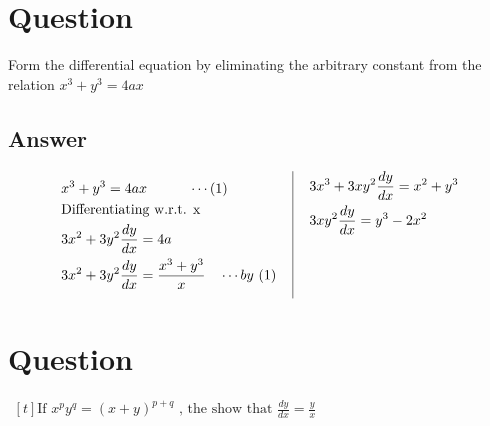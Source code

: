 \documentclass[17pt]{extarticle}
\begin{document}
\noindent
\begin{fleqn} 


\section{Question} 
Form the differential equation by eliminating the arbitrary constant from the relation $ x^3 + y^3 = 4ax$

\subsection*{Answer}
\begin{equation} \nonumber
\begin{alignedat}{4}
&  x^3 + y^3 = 4ax  \quad\quad\quad \cdots (1)  \\
& \text{Differentiating w.r.t. x \ }\\
& 3x^2 + 3y^2 \frac{dy}{dx}= 4a \\
& 3x^2 + 3y^2\frac{dy}{dx}= \frac{x^3+y^3}{x} \quad \cdots by \ (1) \quad \\
\end{alignedat}
\,
\vrule
\quad
\, 
\begin{alignedat}{4}
& 3x^3 + 3xy^2\frac{dy}{dx}=  x^2+y^3\\
& 3xy^2\frac{dy}{dx}=  y^3-2x^2\\& \\
& \\
& \\
\end{alignedat}
\end{equation}
\section{Question} 

$\begin{aligned}[t] 
\text{If \ } x^p y^q = (x+y)^{p+q} \text{\ , \ the show that \ \  } \frac{dy}{dx}=\frac{y}{x}
\end{aligned}$


\end{fleqn}
\end{document}
